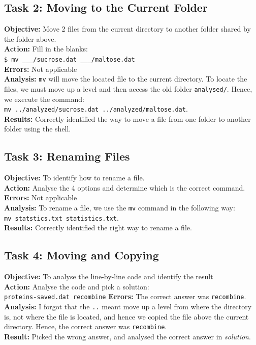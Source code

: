 \documentclass{article}
\begin{document}
\subsection{Task 2: Moving to the Current Folder}
%
\textbf{Objective:} Move 2 files from the current directory to another folder shared by the folder above.\\
\textbf{Action:} Fill in the blanks:\\\verb|$ mv ___/sucrose.dat ___/maltose.dat|\\
\textbf{Errors:} Not applicable\\
\textbf{Analysis:} \verb|mv| will move the located file to the current directory. To locate the files, we must move up a level and then access the old folder \verb|analysed/|. Hence, we execute the command:\\
\verb|mv ../analyzed/sucrose.dat ../analyzed/maltose.dat|.\\
\textbf{Results:} Correctly identified the way to move a file from one folder to another folder using the shell.
%
\subsection{Task 3: Renaming Files}
%
\textbf{Objective:} To identify how to rename a file.\\
\textbf{Action:} Analyse the 4 options and determine which is the correct command.\\
\textbf{Errors:} Not applicable\\
\textbf{Analysis:} To rename a file, we use the \verb|mv| command in the following way:\\\verb|mv statstics.txt statistics.txt|.\\
\textbf{Results:} Correctly identified the right way to rename a file.
%
\subsection{Task 4: Moving and Copying}
%
\textbf{Objective:} To analyse the line-by-line code and identify the result\\
\textbf{Action:} Analyse the code and pick a solution:\\ \verb|proteins-saved.dat recombine|
\textbf{Errors:} The correct answer was \verb|recombine|.\\
\textbf{Analysis:} I forgot that the \verb|..| meant move up a level from where the directory is, not where the file is located, and hence we copied the file above the current directory. Hence, the correct answer was \verb|recombine|.\\
\textbf{Result:} Picked the wrong answer, and analysed the correct answer in \textit{solution}.
%
\end{document}
